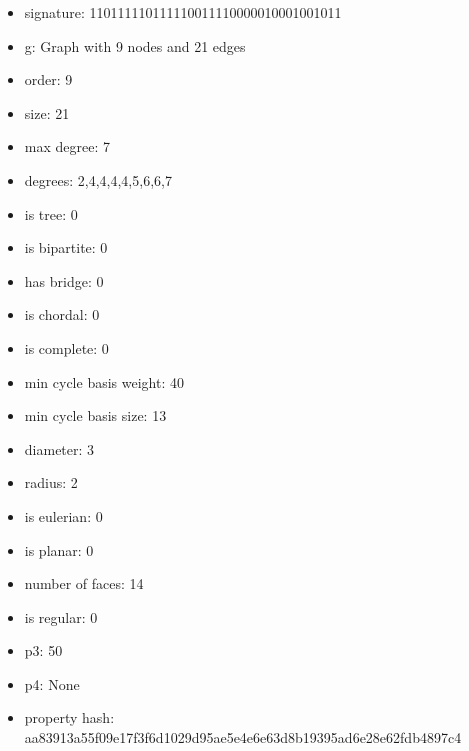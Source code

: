 \newpage
\begin{figure}
\end{figure}
\begin{itemize}
\item signature: 110111110111110011110000010001001011
\item g: Graph with 9 nodes and 21 edges
\item order: 9
\item size: 21
\item max degree: 7
\item degrees: 2,4,4,4,4,5,6,6,7
\item is tree: 0
\item is bipartite: 0
\item has bridge: 0
\item is chordal: 0
\item is complete: 0
\item min cycle basis weight: 40
\item min cycle basis size: 13
\item diameter: 3
\item radius: 2
\item is eulerian: 0
\item is planar: 0
\item number of faces: 14
\item is regular: 0
\item p3: 50
\item p4: None
\item property hash: aa83913a55f09e17f3f6d1029d95ae5e4e6e63d8b19395ad6e28e62fdb4897c4
\end{itemize}
